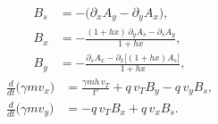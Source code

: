 %
\begin{equation}
  \begin{aligned}
    B_s &= -\big(\partial_x A_y - \partial_y A_x\big), \\
    B_x &= -\frac{(1+hx)\,\partial_y A_s - \partial_s A_y}{1+hx}, \\
    B_y &= -\frac{\partial_s A_x - \partial_x\big[(1+hx)A_s\big]}{1+hx} ,
  \end{aligned}
  \label{eq:B_components}
\end{equation}
%
\begin{equation}
  \begin{aligned}
    \frac{d}{dt}\big(\gamma m v_x\big) &= \frac{\gamma m h\,v_T}{t'} + q\,v_T B_y - q\,v_y B_s , \\
    \frac{d}{dt}\big(\gamma m v_y\big) &= -q\,v_T B_x + q\,v_x B_s .
  \end{aligned}
  \label{eq:el_dt_B}
\end{equation}

